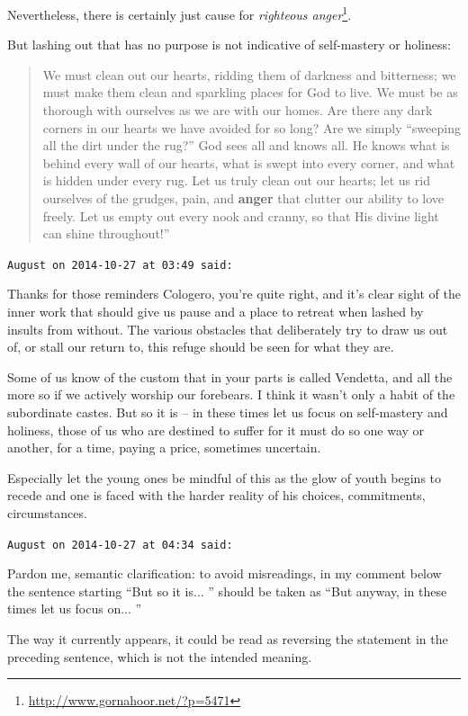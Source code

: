 \begin{footnotesize}
\begin{sffamily}
Nevertheless, there is certainly just cause for \textit{righteous anger}\footnote{\url{http://www.gornahoor.net/?p=5471}}.


But lashing out that has no purpose is not indicative of self-mastery or holiness:

\begin{quote}\footnotesize

We must clean out our hearts, ridding them of darkness and bitterness; we must make them clean and sparkling places for God to live. We must be as thorough with ourselves as we are with our homes. Are there any dark corners in our hearts we have avoided for so long? Are we simply ``sweeping all the dirt under the rug?'' God sees all and knows all. He knows what is behind every wall of our hearts, what is swept into every corner, and what is hidden under every rug. Let us truly clean out our hearts; let us rid ourselves of the grudges, pain, and \textbf{anger} that clutter our ability to love freely. Let us empty out every nook and cranny, so that His divine light can shine throughout!'' 
\end{quote}


\hfill

\texttt{August on 2014-10-27 at 03:49 said:}

Thanks for those reminders Cologero, you're quite right, and it's clear sight of the inner work that should give us pause and a place to retreat when lashed by insults from without. The various obstacles that deliberately try to draw us out of, or stall our return to, this refuge should be seen for what they are.

Some of us know of the custom that in your parts is called Vendetta, and all the more so if we actively worship our forebears. I think it wasn't only a habit of the subordinate castes. But so it is -- in these times let us focus on self-mastery and holiness, those of us who are destined to suffer for it must do so one way or another, for a time, paying a price, sometimes uncertain.

Especially let the young ones be mindful of this as the glow of youth begins to recede and one is faced with the harder reality of his choices, commitments, circumstances.

\hfill

\texttt{August on 2014-10-27 at 04:34 said:}

Pardon me, semantic clarification: to avoid misreadings, in my comment below the sentence starting ``But so it is... '' should be taken as ``But anyway, in these times let us focus on... ''

The way it currently appears, it could be read as reversing the statement in the preceding sentence, which is not the intended meaning.


\hfill

\end{sffamily}
\end{footnotesize}

